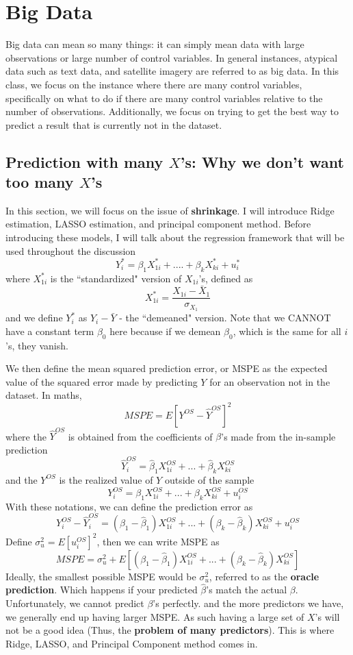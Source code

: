 

\chapter{Big Data}
Big data can mean so many things: it can simply mean data with large observations or large number of control variables. In general instances, atypical data such as text data, and satellite imagery are referred to as big data. In this class, we focus on the instance where there are many control variables, specifically on what to do if there are many control variables relative to the number of observations. Additionally, we focus on trying to get the best way to predict a result that is currently not in the dataset.
\par\medskip 
\section{Prediction with many $X$'s: Why we don't want too many $X$'s}
In this section, we will focus on the issue of \textbf{shrinkage}. I will introduce Ridge estimation, LASSO estimation, and principal component method. Before introducing these models, I will talk about the regression framework that will be used throughout the discussion
\[
Y_{i}^*=\beta_1X_{1i}^*+....+\beta_kX_{ki}^*+u_i^*
\]
where $X_{1i}^*$ is the ``standardized" version of $X_{1i}$'s, defined as
\[
X_{1i}^*=\frac{X_{1i}-\bar{X}_1}{\sigma_{X_{1}}}
\]
and we define $Y^*_i$ as $Y_{i}-\bar{Y}$ - the ``demeaned" version. Note that we CANNOT have a constant term $\beta_0$ here because if we demean $\beta_0$, which is the same for all $i$'s, they vanish. 
\par\medskip
We then define the mean squared prediction error, or MSPE as the expected value of the squared error made by predicting $Y$ for an observation not in the dataset. In maths, 
\[
MSPE= E[Y^{OS}-\hat{Y}^{OS}]^2
\]
where the $\hat{Y}^{OS}$ is obtained from the coefficients of $\beta$'s made from the in-sample prediction
\[
\hat{Y}_i^{OS}=\hat{\beta}_1X_{1i}^{OS}+ ... +\hat{\beta}_kX_{ki}^{OS}
\]
and the $Y^{OS}$ is the realized value of $Y$ outside of the sample
\[
Y_i^{OS}=\beta_1X_{1i}^{OS}+ ... +\beta_kX_{ki}^{OS}+u_i^{OS}
\]
With these notations, we can define the prediction error as
\[
Y_i^{OS}-\hat{Y}_i^{OS}=(\beta_1-\hat{\beta}_1)X^{OS}_{1i}+...+(\beta_k-\hat{\beta}_k)X^{OS}_{ki}+u_i^{OS}
\]
Define $\sigma_u^2=E[u_i^{OS}]^2$, then we can write MSPE as
\[
MSPE=\sigma_u^2+ E[(\beta_1-\hat{\beta}_1)X^{OS}_{1i}+...+(\beta_k-\hat{\beta}_k)X^{OS}_{ki}]
\]
Ideally, the smallest possible MSPE would be $\sigma_u^2$, referred to as the \textbf{oracle prediction}. Which happens if your predicted $\hat{\beta}$'s match the actual $\beta$. Unfortunately, we cannot predict $\beta$'s perfectly. and the more predictors we have, we generally end up having larger MSPE. As such having a large set of $X$'s will not be a good idea (Thus, the \textbf{problem of many predictors}). This is where Ridge, LASSO, and Principal Component method comes in.

